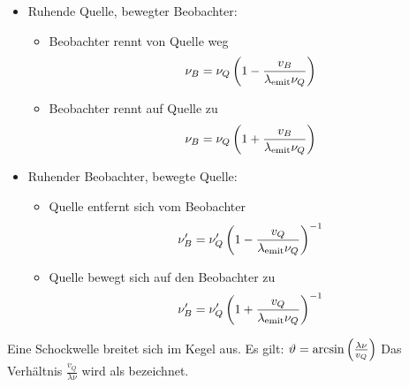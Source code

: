 \begin{itemize}
    \item Ruhende Quelle, bewegter Beobachter:
        \begin{itemize}
            \item Beobachter rennt von Quelle weg
                \begin{align*}
                    \nu_B = \nu_Q \left( 1-\frac{v_B}{\lambda_{\text{emit}} \nu_Q} \right)
                \end{align*}
            \item Beobachter rennt auf Quelle zu
                \begin{align*}
                    \nu_B = \nu_Q \left( 1+\frac{v_B}{\lambda_{\text{emit}} \nu_Q} \right)
                \end{align*}
        \end{itemize}
    \item Ruhender Beobachter, bewegte Quelle:
        \begin{itemize}
            \item Quelle entfernt sich vom Beobachter
                \begin{align*}
                    \nu'_B = \nu'_Q \left( 1-\frac{v_Q}{\lambda_{\text{emit}} \nu_Q} \right)^{-1}
                \end{align*}
            \item Quelle bewegt sich auf den Beobachter zu
                \begin{align*}
                    \nu'_B = \nu'_Q  \left( 1+\frac{v_Q}{\lambda_{\text{emit}} \nu_Q} \right)^{-1}
                \end{align*}
        \end{itemize}
\end{itemize}

\vspace{1\baselineskip}

Eine Schockwelle breitet sich im  Kegel aus. Es gilt:
$\vartheta = \arcsin \left( \frac{\lambda \nu}{v_Q} \right)$
Das Verhältnis $\frac{v_Q}{\lambda \nu}$ wird als 
bezeichnet.